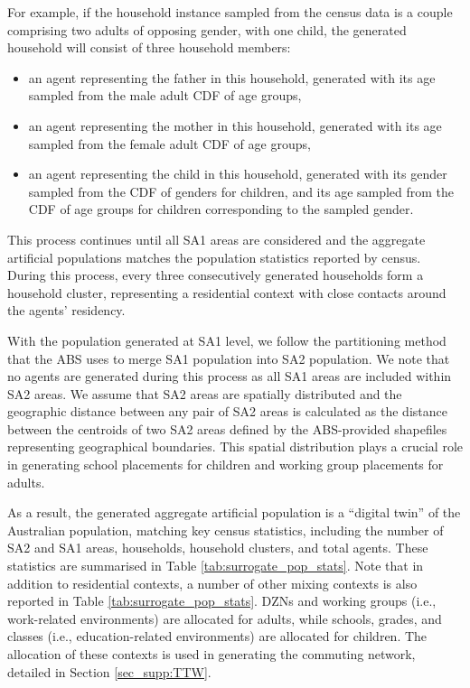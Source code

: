 \documentclass{article}
\begin{document}
\begin{appendices}
    For example, if the  household instance sampled from the census data is a couple comprising two adults of opposing gender, with one child, the generated household will consist of three household members:
    \begin{itemize}
        \item an agent representing the father in this household, generated with its age sampled from the male adult CDF of age groups,
        \item an agent representing the mother in this household, generated with its age sampled from the female adult CDF of age groups,
        \item an agent representing the child in this household, generated with its gender sampled from the CDF of genders for children, and its age sampled from the CDF of age groups for children corresponding to the sampled gender.
    \end{itemize}

This process continues until all SA1 areas are considered and the aggregate artificial populations matches the population statistics reported by census. During this process, every three consecutively generated households form a household cluster, representing a residential context with close contacts around the agents' residency.

With the population generated at SA1 level, we follow the partitioning method that the ABS uses to merge SA1 population into SA2 population. We note that no agents are generated during this process as all SA1 areas are included within  SA2 areas. We assume that SA2 areas are spatially distributed and the geographic distance between any pair of SA2 areas is calculated as the distance between the centroids of two SA2 areas defined by the ABS-provided shapefiles representing geographical boundaries. This spatial distribution plays a crucial role in generating school placements for children and working group placements for adults. 

As a result, the generated aggregate artificial population  is a ``digital twin'' of the Australian population, matching key census statistics, including the number of SA2 and SA1 areas, households, household clusters, and total agents. These statistics are summarised in Table \ref{tab:surrogate_pop_stats}. Note that in addition to residential contexts, a number of other mixing contexts is also reported in Table \ref{tab:surrogate_pop_stats}. DZNs and working groups (i.e., work-related environments) are allocated for adults, while schools, grades, and classes (i.e., education-related environments) are allocated for children. The allocation of these contexts is used in generating the commuting network, detailed in Section \ref{sec_supp:TTW}.


\end{appendices}
\end{document}
